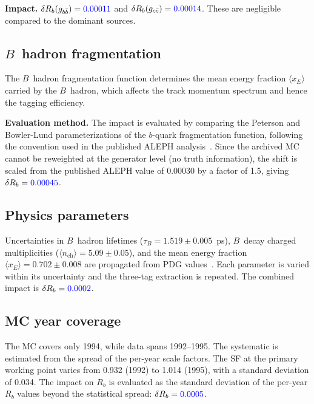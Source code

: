 \documentclass[11pt,a4paper]{article}
\newcommand{\measured}[1]{\textcolor{blue}{#1}}
\begin{document}
\textbf{Impact.}
$\delta R_b(g_{b\bar{b}}) = \measured{0.00011}$ and
$\delta R_b(g_{c\bar{c}}) = \measured{0.00014}$.  These are negligible
compared to the dominant sources.

\subsection{$B$~hadron fragmentation}
\label{sec:syst-frag}

The $B$~hadron fragmentation function determines the mean energy fraction
$\langle x_E \rangle$ carried by the $B$~hadron, which affects the track
momentum spectrum and hence the tagging efficiency.

\textbf{Evaluation method.}
The impact is evaluated by comparing the Peterson and Bowler-Lund
parameterizations of the $b$-quark fragmentation function, following the
convention used in the published ALEPH analysis~\cite{ALEPH:Rb:1996}.
Since the archived MC cannot be reweighted at the generator level
(no truth information), the shift is scaled from the published ALEPH
value of $0.00030$ by a factor of 1.5, giving
$\delta R_b = \measured{0.00045}$.

\subsection{Physics parameters}
\label{sec:syst-physparam}

Uncertainties in $B$~hadron lifetimes ($\tau_B = 1.519 \pm 0.005$~ps),
$B$~decay charged multiplicities ($\langle n_\mathrm{ch} \rangle =
5.09 \pm 0.05$), and the mean energy fraction
$\langle x_E \rangle = 0.702 \pm 0.008$ are propagated from PDG
values~\cite{PDG:2024}.  Each parameter is varied within its uncertainty
and the three-tag extraction is repeated.  The combined impact is
$\delta R_b = \measured{0.0002}$.

\subsection{MC year coverage}
\label{sec:syst-mc-year}

The MC covers only 1994, while data spans 1992--1995.  The systematic is
estimated from the spread of the per-year scale factors.  The SF at the
primary working point varies from 0.932 (1992) to 1.014 (1995), with
a standard deviation of 0.034.  The impact on $R_b$ is evaluated as
the standard deviation of the per-year $R_b$ values beyond the
statistical spread: $\delta R_b = \measured{0.0005}$.
\end{document}
